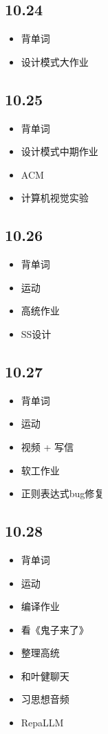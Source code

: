 \documentclass[UTF8]{ctexart}
\begin{document}
\subsection*{10.24}
\begin{itemize}
    \item 背单词
    \item 设计模式大作业
\end{itemize}

\subsection*{10.25}
\begin{itemize}
    \item 背单词
    \item 设计模式中期作业
    \item ACM
    \item 计算机视觉实验
\end{itemize}

\subsection*{10.26}
\begin{itemize}
    \item 背单词
    \item 运动
    \item 高统作业
    \item SS设计
\end{itemize}

\subsection*{10.27}
\begin{itemize}
    \item 背单词
    \item 运动
    \item 视频 + 写信
    \item 软工作业
    \item 正则表达式bug修复
\end{itemize}

\subsection*{10.28}
\begin{itemize}
    \item 背单词
    \item 运动
    \item 编译作业
    \item 看《鬼子来了》
    \item 整理高统
    \item 和叶健聊天
    \item 习思想音频
    \item RepaLLM
\end{itemize}
\end{document}
